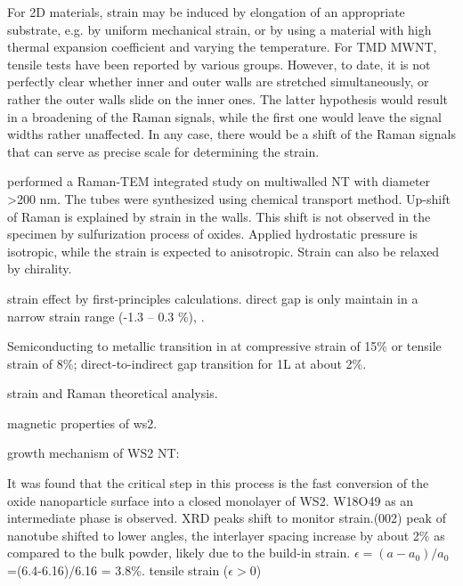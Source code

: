 For 2D materials, strain may be induced by elongation of an appropriate substrate, e.g. by uniform mechanical strain, or by using a material with high thermal expansion coefficient and varying the temperature. For TMD MWNT, tensile tests have been reported by various groups. However, to date, it is not perfectly clear whether inner and outer walls are stretched simultaneously, or rather the outer walls slide on the inner ones. The latter hypothesis would result in a broadening of the Raman signals, while the first one would leave the signal widths rather unaffected. In any case, there would be a shift of the Raman signals that can serve as precise scale for determining the strain.\cite{Ghorbani-Asl2013}


\citeauthor{Virsek2007} performed a Raman-TEM integrated study on multiwalled  NT with diameter \textgreater 200 nm. The tubes were synthesized using chemical transport method. Up-shift of Raman is explained by strain in the walls. This shift is not observed in the specimen by sulfurization process of oxides. Applied hydrostatic pressure is isotropic,\cite{Staiger2012} while the strain is expected to anisotropic. Strain can also be relaxed by chirality.\cite{Virsek2007} 

strain effect by first-principles calculations. direct gap is only maintain in a narrow strain range (-1.3 -- 0.3 \%), \cite{Yun2012}.

Semiconducting to metallic transition in  at compressive strain of 15\% or tensile strain of 8\%; direct-to-indirect gap transition for 1L  at about 2\%. \cite{Scalise2012}

strain and Raman theoretical analysis.\cite{Chang2013a} 

magnetic properties of ws2.\cite{Zhang2013j} 

growth mechanism of WS2 NT:

It was found that the critical step in this process is the fast conversion of the oxide nanoparticle surface into a closed monolayer of WS2. W18O49 as an intermediate phase is observed. XRD peaks shift to monitor strain.(002) peak of nanotube shifted to lower angles, the interlayer spacing increase by about 2\% as compared to the bulk powder, likely due to the build-in strain.\cite{ZAK2009} 
$\epsilon = (a - a_0)/a_0$ =(6.4-6.16)/6.16 = 3.8\%. tensile strain ($\epsilon > 0$)



